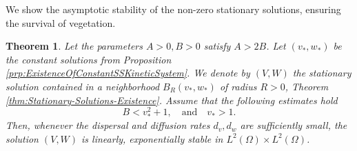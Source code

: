 \documentclass[11pt, a4paper]{article}
\theoremstyle{break}
\newtheorem{thm}{Theorem}[section]
\theoremstyle{break}
\theoremstyle{break}
\theoremstyle{break}
\theoremstyle{break}
\theoremstyle{break}
\theoremstyle{break}
\theoremstyle{break}
\theoremstyle{break}
\begin{document}
We show the asymptotic stability of the non-zero stationary solutions, ensuring the survival of vegetation.

\begin{thm}
    \label{thm:Stationary-Solutions-Stability}
    Let the parameters $A > 0, B >0$ satisfy $A > 2B$. Let $(v_*, w_*)$ be the constant solutions  from Proposition \ref{prp:ExistenceOfConstantSSKineticSystem}. We denote by $(V, W)$ the stationary solution contained in a neighborhood $B_R(v_*, w_*)$ of radius $R>0$, Theorem \ref{thm:Stationary-Solutions-Existence}.  Assume that the following estimates hold
    \begin{equation}
        \label{eq:multiplicative_op_negative_spectrum_condition}
        B < v_*^2 + 1, 
        \quad
        \text{and}
        \quad
        v_* > 1.
    \end{equation}
    Then, whenever the  dispersal and diffusion rates $d_v, d_w$ are sufficiently small, the solution $(V, W)$ is linearly, exponentially stable in $L^2(\Omega) \times L^2(\Omega)$.
\end{thm}
\end{document}
